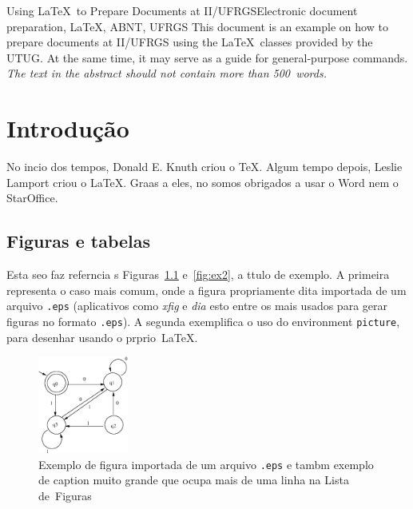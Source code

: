 \documentclass[diss]{template/setrem}
\begin{document}
\begin{englishabstract}{Using \LaTeX\ to Prepare Documents at II/UFRGS}{Electronic document preparation, \LaTeX, ABNT, UFRGS}
This document is an example on how to prepare documents at II/UFRGS
using the \LaTeX\ classes provided by the UTUG\@. At the same time, it
may serve as a guide for general-purpose commands. \emph{The text in
the abstract should not contain more than 500~words.}
\end{englishabstract}


\chapter{Introdução}
No incio dos tempos, Donald E. Knuth criou o \TeX. Algum tempo depois, Leslie Lamport criou o \LaTeX. Graas a eles, no somos obrigados a usar o Word nem o StarOffice.

\section{Figuras e tabelas}
Esta seo faz referncia s Figuras~\ref{fig:ex1} e~\ref{fig:ex2}, a ttulo de exemplo. A primeira representa o caso mais comum, onde a figura propriamente dita  importada de um arquivo \texttt{.eps} (aplicativos como \emph{xfig} e \emph{dia} esto entre os mais usados para gerar figuras no formato \texttt{.eps}). A segunda exemplifica o uso do environment \texttt{picture}, para desenhar usando o prprio~\LaTeX.

\begin{figure}
        \centerline{\includegraphics[width=8em]{fig.eps}}
        \caption{Exemplo de figura importada de um arquivo \texttt{.eps} e tambm exemplo de caption muito grande que ocupa mais de uma linha na Lista de~Figuras}
        \label{fig:ex1}
\end{figure}
\end{document}
